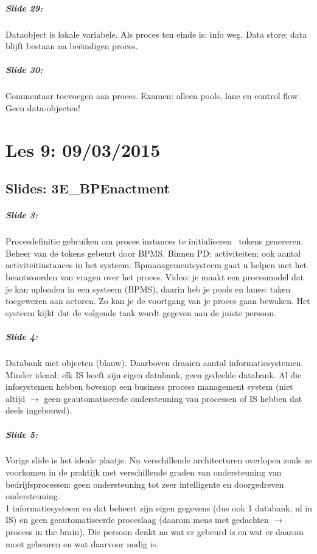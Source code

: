 \documentclass[10pt,a4paper]{report}
\begin{document}
\paragraph{Slide 29:}Dataobject is lokale variabele. Als proces ten einde is: info weg. Data store: data blijft bestaan na beëindigen proces.

\paragraph{Slide 30:}Commentaar toevoegen aan proces. Examen: alleen pools, lane en control flow. Geen data-objecten!

\chapter{Les 9: 09/03/2015}
\section{Slides: 3E\_BPEnactment}
\paragraph{Slide 3:}Procesdefinitie gebruiken om proces instances te initialiseren ~tokens genereren. Beheer van de tokens gebeurt door BPMS.
Binnen PD: activiteiten: ook aantal activiteitinstances in het systeem. 
Bpmanagementsysteem gaat u helpen met het beantwoorden van vragen over het proces.
Video: je maakt een procesmodel dat je kan uploaden in een systeem (BPMS), daarin heb je pools en lanes: taken toegewezen aan actoren. Zo kan je de voortgang van je proces gaan bewaken. Het systeem kijkt dat de volgende taak wordt gegeven aan de juiste persoon.

\paragraph{Slide 4:}Databank met objecten (blauw). Daarboven draaien aantal informatiesystemen. Minder ideaal: elk IS heeft zijn eigen databank, geen gedeelde databank. Al die infosystemen hebben bovenop een business process management system (niet altijd $\rightarrow$ geen geautomatiseerde ondersteuning van processen of IS hebben dat deels ingebouwd).

\paragraph{Slide 5:}Vorige slide is het ideale plaatje. Nu verschillende architecturen overlopen zoals ze voorkomen in de praktijk met verschillende graden van ondersteuning van bedrijfsprocessen: geen ondersteuning tot zeer intelligente en doorgedreven ondersteuning.\\
1 informatiesysteem en dat beheert zijn eigen gegevens (dus ook 1 databank, nl in IS) en geen geautomatiseerde proceslaag (daarom mens met gedachten $\rightarrow$ process in the brain). Die persoon denkt na wat er gebeurd is en wat er daarom moet gebeuren en wat daarvoor nodig is.
\end{document}
